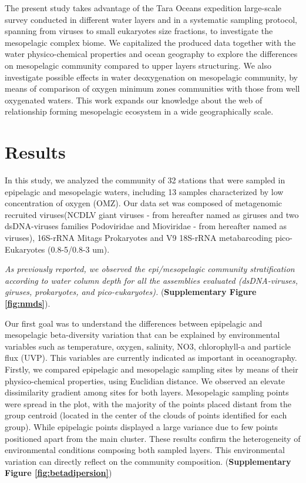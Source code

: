\documentclass[fleqn,10pt]{wlscirep}
\begin{document}
The present study takes advantage of the Tara Oceans expedition large-scale survey conducted in different water layers and in a systematic sampling protocol, spanning from viruses to small eukaryotes size fractions, to investigate the mesopelagic complex biome. We capitalized the produced data together with the water physico-chemical properties and ocean geography to explore the differences on mesopelagic community compared to upper layers structuring. We also investigate possible effects in water deoxygenation on mesopelagic community, by means of comparison of oxygen minimum zones communities with those from well oxygenated waters. This work expands our knowledge about the web of relationship forming mesopelagic ecosystem in a wide geographically scale.

\section*{Results}

In this study, we analyzed the community of 32 stations that were sampled in epipelagic and mesopelagic waters, including 13 samples characterized by low concentration of oxygen (OMZ). Our data set was composed of metagenomic recruited viruses(NCDLV giant viruses - from hereafter named as giruses and two dsDNA-viruses families Podoviridae and Mioviridae - from hereafter named as viruses), 16S-rRNA Mitags Prokaryotes and V9 18S-rRNA metabarcoding pico-Eukaryotes (0.8-5/0.8-3 um).

\textit{As previously reported, we observed the epi/mesopelagic community stratification according to water column depth for all the assemblies evaluated (dsDNA-viruses, giruses, prokaryotes, and pico-eukaryotes).}  (\textbf{Supplementary Figure \ref{fig:nmds}}). %

Our first goal was to understand the differences between epipelagic and mesopelagic beta-diversity variation that can be explained by environmental variables such as temperature, oxygen, salinity, NO3, chlorophyll-a and particle flux (UVP). This variables are currently indicated as important in oceanography. Firstly, we compared epipelagic and mesopelagic sampling sites by means of their physico-chemical properties, using Euclidian distance. We observed an elevate dissimilarity gradient among sites for both layers. Mesopelagic sampling points were spread in the plot, with the majority of the points placed distant from the group centroid (located in the center of the clouds of points identified for each group). While epipelagic points displayed a large variance due to few points positioned apart from the main cluster. %
These results confirm the heterogeneity of environmental conditions composing both sampled layers. This environmental variation can directly reflect on the community composition.  (\textbf{Supplementary Figure \ref{fig:betadipersion}})
\end{document}
